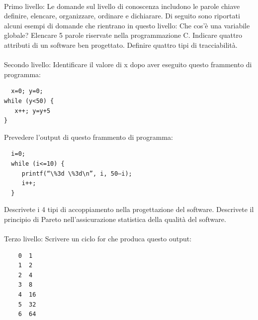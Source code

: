 \begin{itemize}
\\
Primo livello: Le domande sul livello di conoscenza includono le parole chiave definire, elencare, organizzare, ordinare e dichiarare.
Di seguito sono riportati alcuni esempi di domande che rientrano in questo livello:
Che cos'è una variabile globale?
Elencare 5 parole riservate nella programmazione C.
Indicare quattro attributi di un software ben progettato.
Definire quattro tipi di tracciabilità.\\
\\
Secondo livello: Identificare il valore di x dopo aver eseguito questo frammento di programma:
\begin{lstlisting}
  x=0; y=0;
while (y<50) {
   x++; y=y+5
}
  \end{lstlisting}

Prevedere l'output di questo frammento di programma:

\begin{lstlisting}
  i=0;
  while (i<=10) {
     printf(“\%3d \%3d\n”, i, 50–i);
     i++;
  }
  \end{lstlisting}
  Descrivete i 4 tipi di accoppiamento nella progettazione del software.
  Descrivete il principio di Pareto nell'assicurazione statistica della qualità del software.\\
  \\
  Terzo livello: Scrivere un ciclo for che produca questo output:

  \begin{lstlisting}
    0  1
    1  2
    2  4
    3  8
    4  16
    5  32
    6  64
    \end{lstlisting}


\end{itemize}
